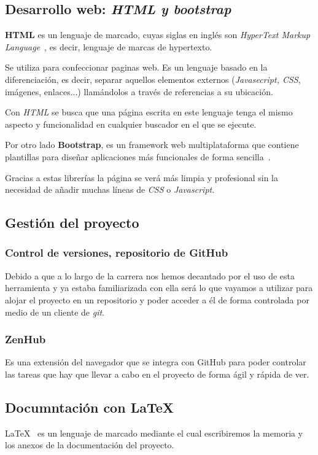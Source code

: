 \subsection{Desarrollo web: \textit{HTML y bootstrap}}
\textbf{HTML} es un lenguaje de marcado, cuyas siglas en inglés son \textit{HyperText Markup Language}~\cite{html}, es decir, lenguaje de marcas de hypertexto.

Se utiliza para confeccionar paginas web. Es un lenguaje basado en la diferenciación, es decir, separar aquellos elementos externos (\textit{Javasecript, CSS}, imágenes, enlaces...) llamándolos a través de referencias a su ubicación.

Con \textit{HTML} se busca que una página escrita en este lenguaje tenga el mismo aspecto y funcionalidad en cualquier buscador en el que se ejecute.

Por otro lado \textbf{Bootstrap}, es un  framework web multiplataforma que contiene plantillas para diseñar aplicaciones más funcionales de forma sencilla~\cite{bootstrap}.

Gracias a estas librerías la página se verá más limpia y profesional sin la necesidad de añadir muchas líneas de \textit{CSS} o \textit{Javascript}.
 

\subsection{Gestión del proyecto}
\subsubsection{Control de versiones, repositorio de GitHub}

Debido a que a lo largo de la carrera nos hemos decantado por el uso de esta herramienta y ya estaba familiarizada con ella será lo que vayamos a utilizar para alojar el proyecto en un repositorio y poder acceder a él de forma controlada por medio de un cliente de \textit{git}.

\subsubsection{ZenHub}
Es una extensión del navegador que se integra con GitHub para poder controlar las tareas que hay que llevar a cabo en el proyecto de forma ágil y rápida de ver.

\subsection{Documntación con \LaTeX{}}
\LaTeX{}~\cite{tex} es un lenguaje de marcado mediante el cual escribiremos la memoria y los anexos de la documentación del proyecto.

